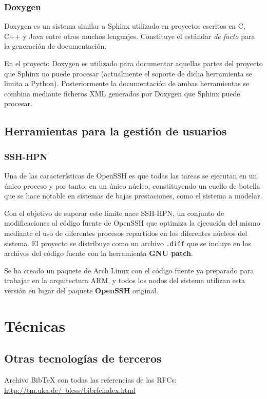 \subsection{Doxygen}

Doxygen es un sistema similar a Sphinx utilizado en proyectos escritos en C, C++ y Java entre otros muchos lenguajes. Constituye el estándar \textit{de facto} para la generación de documentación.

En el proyecto Doxygen es utilizado para documentar aquellas partes del proyecto que Sphinx no puede procesar (actualmente el soporte de dicha herramienta se limita a Python). Posteriormente la documentación de ambas herramientas se combina mediante ficheros XML generados por Doxygen que Sphinx puede procesar.

\section{Herramientas para la gestión de usuarios}

\subsection{SSH-HPN}

Una de las características de OpenSSH es que todas las tareas se ejecutan en un único proceso y por tanto, en un único núcleo, constituyendo un cuello de botella que se hace notable en sistemas de bajas prestaciones, como el sistema a modelar.

Con el objetivo de superar este límite nace SSH-HPN\citationneeded, un conjunto de modificaciones al código fuente de OpenSSH que optimiza la ejecución del mismo mediante el uso de diferentes procesos repartidos en los diferentes núcleos del sistema. El proyecto se distribuye como un archivo \texttt{.diff} que se incluye en los archivos del código fuente con la herramienta \textbf{GNU patch}.

Se ha creado un paquete de Arch Linux con el código fuente ya preparado para trabajar en la arquitectura ARM, y todos los nodos del sistema utilizan esta versión en lugar del paquete \textbf{OpenSSH} original.




\chapter{Técnicas}

\section{Otras tecnologías de terceros}

Archivo BibTeX con todas las referencias de las RFCs: \href{http://tm.uka.de/~bless/bibrfcindex.html}{http://tm.uka.de/~bless/bibrfcindex.html}
